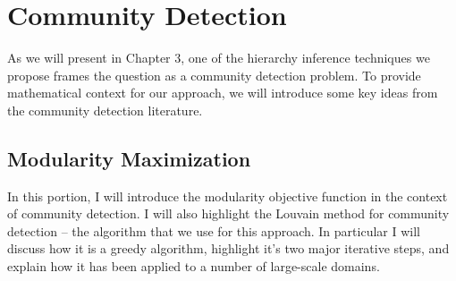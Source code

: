 \documentclass[../thesis.tex]{subfiles}
\begin{document}
\section{Community Detection}
As we will present in Chapter 3, one of the hierarchy inference techniques we propose frames the question as a community detection problem. To provide mathematical context for our approach, we will introduce some key ideas from the community detection literature.

\subsection{Modularity Maximization}
In this portion, I will introduce the modularity objective function in the context of community detection. I will also highlight the Louvain method for community detection -- the algorithm that we use for this approach. In particular I will discuss how it is a greedy algorithm, highlight it's two major iterative steps, and explain how it has been applied to a number of large-scale domains.
\end{document}
